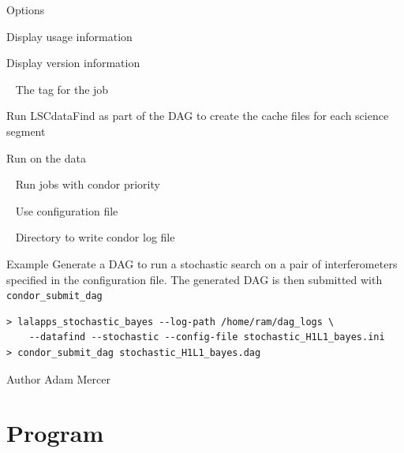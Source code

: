\begin{entry}
\item[Options]\leavevmode
\begin{entry}
\item[\option{--help}] Display usage information
\item[\option{--version}] Display version information
\item[\option{--user-tag}~\parm{TAG}] The tag for the job
\item[\option{--datafind}] Run LSCdataFind as part of the DAG to create
the cache files for each science segment
\item[\option{--stochastic}] Run  on the data
\item[\option{--priority}~\parm{PRIO}] Run jobs with condor priority 
\item[\option{--config-file}~\parm{FILE}] Use configuration file 
\item[\option{--log-path}~\parm{PATH}] Directory to write condor log file
\end{entry}

\item[Example]
Generate a DAG to run a stochastic search on a pair of interferometers
specified in the configuration file. The generated DAG is then submitted
with \texttt{condor\_submit\_dag}

\begin{verbatim}
> lalapps_stochastic_bayes --log-path /home/ram/dag_logs \
    --datafind --stochastic --config-file stochastic_H1L1_bayes.ini
> condor_submit_dag stochastic_H1L1_bayes.dag
\end{verbatim}

\item[Author]
Adam Mercer
\end{entry}

\clearpage
\section{Program }
\label{program:lalapps-stochastic}

